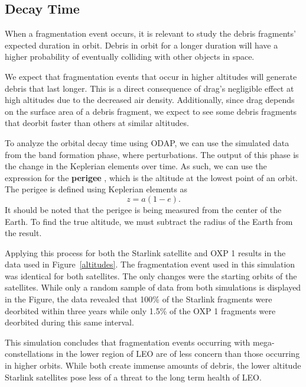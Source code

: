 \documentclass[a4paper, 12pt]{article}
\newcommand{\lindex}[1]{%
	\lowercase{\def\temp{#1}}%
	\expandafter\index\expandafter{\temp}%
}
\newcommand{\boldindex}[1]{%
	\textbf{#1}\lindex{#1}%
}
\begin{document}
\subsection{Decay Time}

When a fragmentation event occurs, it is relevant to study the debris fragments' expected duration in orbit. Debris in orbit for a longer duration will have a higher probability of eventually colliding with other objects in space.

We expect that fragmentation events that occur in higher altitudes will generate debris that last longer. This is a direct consequence of drag's negligible effect at high altitudes due to the decreased air density. Additionally, since drag depends on the surface area of a debris fragment, we expect to see some debris fragments that deorbit faster than others at similar altitudes.

To analyze the orbital decay time using ODAP, we can use the simulated data from the band formation phase, where  perturbations. The output of this phase is the change in the Keplerian elements over time. As such, we can use the expression for the \boldindex{perigee}, which is the altitude at the lowest point of an orbit. The perigee is defined using Keplerian elements as
\begin{equation}
	z = a (1 - e).
\end{equation}
It should be noted that the perigee is being measured from the center of the Earth. To find the true altitude, we must subtract the radius of the Earth from the result.

Applying this process for both the Starlink satellite and OXP 1 results in the data used in Figure~\ref{altitudes}. The fragmentation event used in this simulation was identical for both satellites. The only changes were the starting orbits of the satellites. While only a random sample of data from both simulations is displayed in the Figure, the data revealed that 100\% of the Starlink fragments were deorbited within three years while only 1.5\% of the OXP 1 fragments were deorbited during this same interval.

This simulation concludes that fragmentation events occurring with mega-constellations in the lower region of LEO are of less concern than those occurring in higher orbits. While both create immense amounts of debris, the lower altitude Starlink satellites pose less of a threat to the long term health of LEO.
\end{document}
